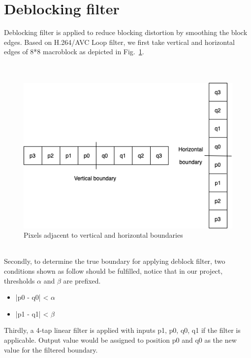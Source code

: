 \documentclass[twocolumn]{article}  %
\begin{document}
\section{Deblocking filter}
Deblocking filter is applied to reduce blocking distortion by smoothing the block edges. Based on H.264/AVC Loop filter\cite{deblock}, we first take vertical and horizontal edges of 8*8 macroblock as depicted in Fig.~\ref{fig:0}. \\
\\
\\
\begin{figure}[h]
\centering
\includegraphics[scale=0.45]{boundary.png}
\caption{Pixels adjacent to vertical and horizontal boundaries}
\label{fig:0}
\end{figure}\\
Secondly, to determine the true boundary for applying deblock filter, two conditions shown as follow should be fulfilled, notice that in our project, thresholds $\alpha$ and $\beta$ are prefixed.
\begin{itemize}
\item |p0 - q0| < $\alpha$
\item |p1 - q1| < $\beta$
\end{itemize}
Thirdly, a 4-tap linear filter is applied with inputs p1, p0, q0, q1 if the filter is applicable. Output value would be assigned to position p0 and q0 as the new value for the filtered boundary. 

\end{document}
